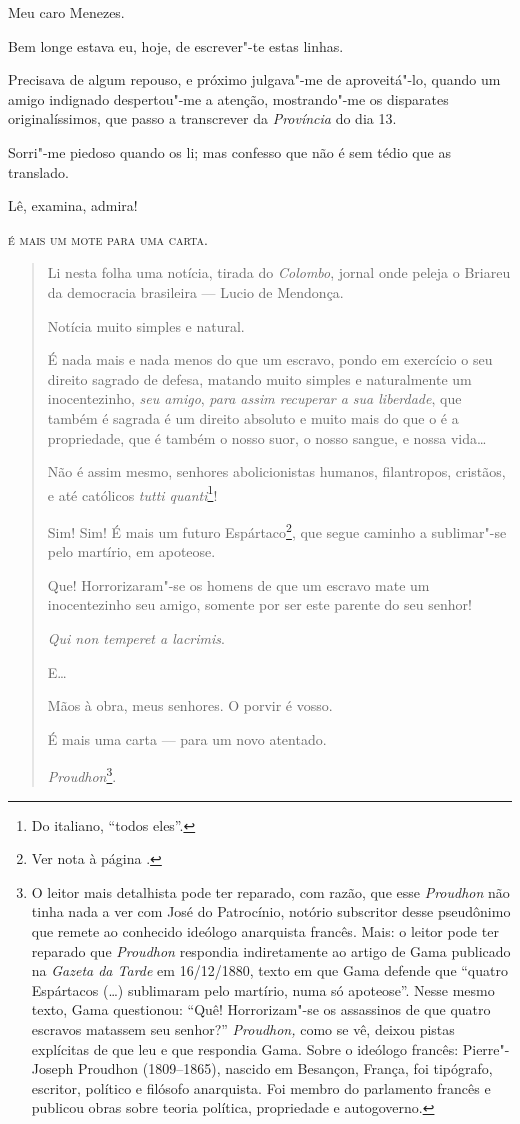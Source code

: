 \noindent{}Meu caro Menezes.\smallskip

Bem longe estava eu, hoje, de escrever"-te estas linhas.

Precisava de algum repouso, e próximo julgava"-me de aproveitá"-lo, quando
um amigo indignado despertou"-me a atenção, mostrando"-me os disparates
originalíssimos, que passo a transcrever da \emph{Província} do dia 13.

Sorri"-me piedoso quando os li; mas confesso que não é sem tédio que as
translado.

Lê, examina, admira!

\textsc{é mais um mote para uma carta.}

\begin{quote}
Li nesta folha uma notícia, tirada do \emph{Colombo}, jornal onde peleja
o Briareu da democracia brasileira --- Lucio de Mendonça.

Notícia muito simples e natural.

É nada mais e nada menos do que um escravo, pondo em exercício o seu
direito sagrado de defesa, matando muito simples e naturalmente um
inocentezinho, \emph{seu amigo}, \emph{para assim recuperar a sua
liberdade}, que também é sagrada é um direito absoluto e muito mais do
que o é a propriedade, que é também o nosso suor, o nosso sangue, e
nossa vida\ldots{}

Não é assim mesmo, senhores abolicionistas humanos, filantropos,
cristãos, e até católicos \emph{tutti quanti}\footnote{Do italiano,
  ``todos eles''.}!

\noindent\dotfill{}

Sim! Sim! É mais um futuro Espártaco\footnote{Ver nota à página \pageref{espartacos}.}, que segue caminho a sublimar"-se pelo martírio, em
apoteose.

Que! Horrorizaram"-se os homens de que um escravo mate um inocentezinho
seu amigo, somente por ser este parente do seu senhor!

\emph{Qui non temperet a lacrimis}.

E\ldots{}

Mãos à obra, meus senhores. O porvir é vosso.

É mais uma carta --- para um novo atentado.

\hfill\emph{Proudhon}\footnote{O leitor mais detalhista pode ter reparado,
  com razão, que esse \emph{Proudhon} não tinha nada a ver com José do
  Patrocínio, notório subscritor desse pseudônimo que remete ao
  conhecido ideólogo anarquista francês. Mais: o leitor pode ter
  reparado que \emph{Proudhon} respondia indiretamente ao artigo de Gama
  publicado na \emph{Gazeta da Tarde} em 16/12/1880, texto em que Gama
  defende que ``quatro Espártacos (\ldots{}) sublimaram pelo martírio, numa só
  apoteose''. Nesse mesmo texto, Gama questionou: ``Quê! Horrorizam"-se os
  assassinos de que quatro escravos matassem seu senhor?''
  \emph{Proudhon,} como se vê, deixou pistas explícitas de que leu e que
  respondia Gama. Sobre o ideólogo francês: Pierre"-Joseph Proudhon
  (1809--1865), nascido em Besançon, França, foi tipógrafo, escritor,
  político e filósofo anarquista. Foi membro do parlamento francês e
  publicou obras sobre teoria política, propriedade e autogoverno.}.
\end{quote}


